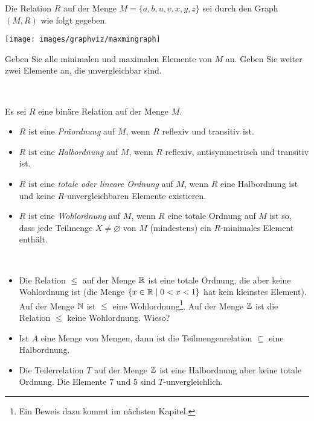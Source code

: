     \begin{ueb}
    Die Relation $R$ auf der Menge $M=\{a,b,u,v,x,y,z\}$ sei durch den Graph $(M,R)$ wie folgt
    gegeben.
    \begin{center}
    \texttt{[image: images/graphviz/maxmingraph]}
    \end{center}
    Geben Sie alle minimalen und maximalen Elemente von $M$ an. Geben Sie weiter zwei Elemente an, die unvergleichbar sind.
    \end{ueb}
    \begin{lsg}~
    \end{lsg}

    \begin{df}
    Es sei $R$ eine binäre Relation auf der Menge $M$.
    \begin{itemize}
    \item $R$ ist eine \textit{Präordnung} auf $M$, wenn $R$ reflexiv und transitiv ist.
    \item $R$ ist eine \textit{Halbordnung} auf $M$, wenn $R$ reflexiv, antisymmetrisch und transitiv ist.
    \item $R$ ist eine \textit{totale oder lineare Ordnung} auf $M$, wenn $R$ eine Halbordnung ist und keine $R$-unvergleichbaren Elemente existieren.
    \item $R$ ist eine \textit{Wohlordnung} auf $M$, wenn $R$ eine totale Ordnung auf $M$ ist so, dass jede Teilmenge $X\neq\varnothing$ von $M$ (mindestens) ein $R$-minimales Element enthält.
    \end{itemize}
    \end{df}


    \begin{bsp}~
    \begin{itemize}
    \item Die Relation $\leq$ auf der Menge $\mathbb{R}$ ist eine totale Ordnung, die aber keine Wohlordnung ist (die Menge $\{x\in\mathbb{R}\mid 0<x<1\}$ hat kein kleinstes Element). Auf der Menge $\mathbb{N}$ ist $\leq$ eine Wohlordnung\footnote{Ein Beweis dazu kommt im nächsten Kapitel.}. Auf der Menge $\mathbb{Z}$ ist die Relation $\leq$ keine Wohlordnung. Wieso?
    \item Ist $A$ eine Menge von Mengen, dann ist die Teilmengenrelation $\subseteq$ eine Halbordnung.
    \item Die Teilerrelation $T$ auf der Menge $\mathbb{Z}$ ist eine Halbordnung aber keine totale Ordnung. Die Elemente $7$ und $5$ sind $T$-unvergleichlich.
    \end{itemize}
    \end{bsp}

